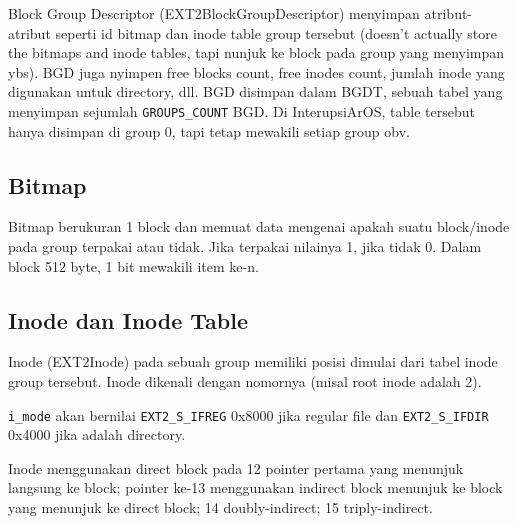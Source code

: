 Block Group Descriptor (EXT2BlockGroupDescriptor) menyimpan atribut-atribut seperti id bitmap dan inode table group tersebut (doesn't actually store the bitmaps and inode tables, tapi nunjuk ke block pada group yang menyimpan ybs). BGD juga nyimpen free blocks count, free inodes count, jumlah inode yang digunakan untuk directory, dll. BGD disimpan dalam BGDT, sebuah tabel yang menyimpan sejumlah \texttt{GROUPS\_COUNT} BGD. Di InterupsiArOS, table tersebut hanya disimpan di group 0, tapi tetap mewakili setiap group obv.

\subsection{Bitmap}
Bitmap berukuran 1 block dan memuat data mengenai apakah suatu block/inode pada group terpakai atau tidak. Jika terpakai nilainya 1, jika tidak 0. Dalam block 512 byte, 1 bit mewakili item ke-n.

\subsection{Inode dan Inode Table}

Inode (EXT2Inode) pada sebuah group memiliki posisi dimulai dari tabel inode group tersebut. Inode dikenali dengan nomornya (misal root inode adalah 2).

\begin{table}[htbp]
\centering
{}
\end{table}

\texttt{i\_mode} akan bernilai \texttt{EXT2\_S\_IFREG} 0x8000 jika regular file dan \texttt{EXT2\_S\_IFDIR} 0x4000 jika adalah directory.

Inode menggunakan direct block pada 12 pointer pertama yang menunjuk langsung ke block; pointer ke-13 menggunakan indirect block menunjuk ke block yang menunjuk ke direct block; 14 doubly-indirect; 15 triply-indirect.

